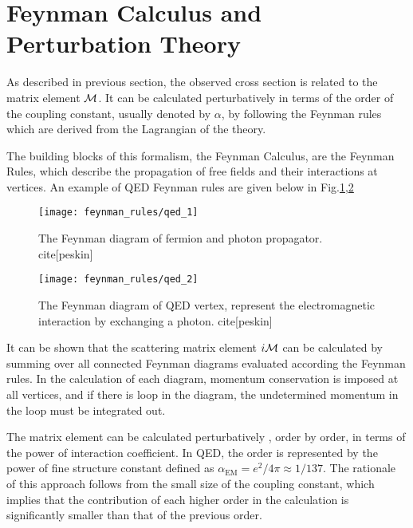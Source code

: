 \section{Feynman Calculus and Perturbation Theory}
As described in previous section, the observed cross section is related to the matrix element $\mathcal{M}$. It can be calculated perturbatively in terms of the order of the coupling constant, usually denoted by $\alpha$, by following the Feynman rules which are derived from the Lagrangian of the theory.
 
The building blocks of this formalism, the Feynman Calculus, are the Feynman Rules, which describe the propagation of free fields and their interactions at vertices. An example of QED Feynman rules are given below in Fig.\ref{fig:QED_1},\ref{fig:QED_2}
 
 \begin{figure}[hbt]
 	\begin{center}
 		\texttt{[image: feynman\_rules/qed\_1]}
 		\caption{\small The Feynman diagram of fermion and photon propagator. cite[peskin]}
 		\label{fig:QED_1}
 	\end{center}
 \end{figure}

 \begin{figure}[hbt]
	\begin{center}
		\texttt{[image: feynman\_rules/qed\_2]}
		\caption{\small The Feynman diagram of QED vertex, represent the electromagnetic interaction by exchanging a photon. cite[peskin]}
		\label{fig:QED_2}
	\end{center}
\end{figure}
 
It can be shown that the scattering matrix element $i\mathcal{M}$ can be calculated by summing over all connected Feynman diagrams evaluated according the Feynman rules. In the calculation of each diagram, momentum conservation is imposed at all vertices, and if there is loop in the diagram, the undetermined momentum in the loop must be integrated out. 

The matrix element can be calculated perturbatively , order by order, in terms of the power of interaction coefficient. In QED, the order is represented by the power of fine structure constant defined as $\alpha_{\mathrm{EM}} = e^2/4\pi\approx 1/137$.  The rationale of this approach follows from the small size of  the coupling constant, which implies that the contribution of each higher order in the calculation is significantly smaller than that of the previous order.

